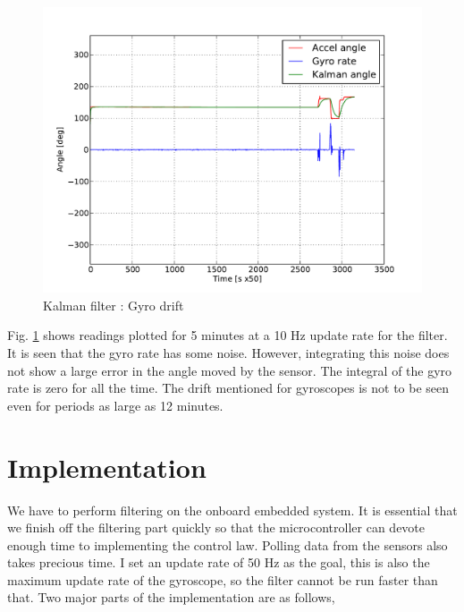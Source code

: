 \begin{figure}[!h]
\centering
\includegraphics[scale=0.8]{fig/kalman_drift.pdf}
\caption{Kalman filter : Gyro drift}
\label{fig:5_kalman_gyrodrift}
\end{figure}
\newpage
Fig. \ref{fig:5_kalman_gyrodrift} shows readings plotted for 5 minutes at a 10 Hz update rate for the filter. It is seen that the
gyro rate has some noise. However, integrating this noise does not show a large error in the angle moved by the sensor. The
integral of the gyro rate is zero for all the time. The drift mentioned for gyroscopes is not to be seen even for periods as large as
12 minutes.

\section{Implementation}
We have to perform filtering on the onboard embedded system. It is essential that we finish off
the filtering part quickly so that the microcontroller can devote enough time to implementing
the control law. Polling data from the sensors also takes precious time. I set an update rate of 50 Hz
as the goal, this is also the maximum update rate of the gyroscope, so the filter cannot be run faster
than that. Two major parts of the implementation are as follows,

